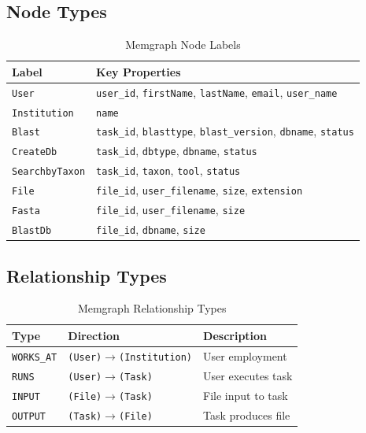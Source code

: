 \subsection{Node Types}

\begin{table}[ht]
\centering
\caption{Memgraph Node Labels}
\label{tab:memgraph-nodes}
\small
\begin{tabularx}{\textwidth}{lX}
    \hline
    \textbf{Label} & \textbf{Key Properties} \\
    \hline
    \texttt{User} & \texttt{user\_id}, \texttt{firstName}, \texttt{lastName}, \texttt{email}, \texttt{user\_name} \\
    \texttt{Institution} & \texttt{name} \\
    \texttt{Blast} & \texttt{task\_id}, \texttt{blasttype}, \texttt{blast\_version}, \texttt{dbname}, \texttt{status} \\
    \texttt{CreateDb} & \texttt{task\_id}, \texttt{dbtype}, \texttt{dbname}, \texttt{status} \\
    \texttt{SearchbyTaxon} & \texttt{task\_id}, \texttt{taxon}, \texttt{tool}, \texttt{status} \\
    \texttt{File} & \texttt{file\_id}, \texttt{user\_filename}, \texttt{size}, \texttt{extension} \\
    \texttt{Fasta} & \texttt{file\_id}, \texttt{user\_filename}, \texttt{size} \\
    \texttt{BlastDb} & \texttt{file\_id}, \texttt{dbname}, \texttt{size} \\
    \hline
\end{tabularx}
\end{table}

\subsection{Relationship Types}

\begin{table}[ht]
\centering
\caption{Memgraph Relationship Types}
\label{tab:memgraph-rels}
\small
\begin{tabularx}{\textwidth}{llX}
    \hline
    \textbf{Type} & \textbf{Direction} & \textbf{Description} \\
    \hline
    \texttt{WORKS\_AT} & \texttt{(User)$\rightarrow$(Institution)} & User employment \\
    \texttt{RUNS} & \texttt{(User)$\rightarrow$(Task)} & User executes task \\
    \texttt{INPUT} & \texttt{(File)$\rightarrow$(Task)} & File input to task \\
    \texttt{OUTPUT} & \texttt{(Task)$\rightarrow$(File)} & Task produces file \\
    \hline
\end{tabularx}
\end{table}

